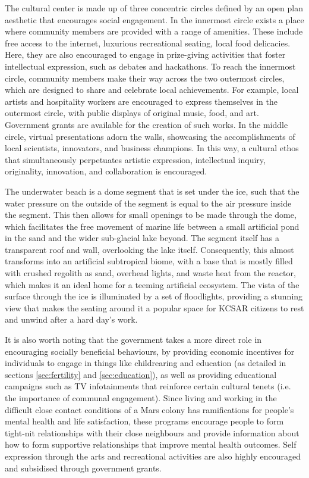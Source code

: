 \documentclass[fleqn,10pt]{Stylesheet} %
\begin{document}
The cultural center is made up of three concentric circles defined by an open plan aesthetic that encourages social engagement. In the innermost circle exists a place where community members are provided with a range of amenities. These include free access to the internet, luxurious recreational seating, local food delicacies. Here, they are also encouraged to engage in prize-giving activities that foster intellectual expression, such as debates and hackathons. To reach the innermost circle, community members make their way across the two outermost circles, which are designed to share and celebrate local achievements. For example, local artists and hospitality workers are encouraged to express themselves in the outermost circle, with public displays of original music, food, and art. Government grants are available for the creation of such works. In the middle circle, virtual presentations adorn the walls, showcasing the accomplishments of local scientists, innovators, and business champions. In this way, a cultural ethos that simultaneously perpetuates artistic expression, intellectual inquiry, originality, innovation, and collaboration is encouraged. 

The underwater beach is a dome segment that is set under the ice, such that the water pressure on the outside of the segment is equal to the air pressure inside the segment. This then allows for small openings to be made through the dome, which facilitates the free movement of marine life between a small artificial pond in the sand and the wider sub-glacial lake beyond. The segment itself has a transparent roof and wall, overlooking the lake itself. Consequently, this almost transforms into an artificial subtropical biome, with a base that is mostly filled with crushed regolith as sand, overhead lights, and waste heat from the reactor, which makes it an ideal home for a teeming artificial ecosystem. The vista of the surface through the ice is illuminated by a set of floodlights, providing a stunning view that makes the seating around it a popular space for KCSAR citizens to rest and unwind after a hard day's work.

It is also worth noting that the government takes a more direct role in encouraging socially beneficial behaviours, by providing economic incentives for individuals to engage in things like childrearing and education (as detailed in sections \ref{sec:fertility} and \ref{sec:education}), as well as providing educational campaigns such as TV infotainments that reinforce certain cultural tenets (i.e. the importance of communal engagement). Since living and working in the difficult close contact conditions of a Mars colony has ramifications for people's mental health and life satisfaction, these programs encourage people to form tight-nit relationships with their close neighbours and provide information about how to form supportive relationships that improve mental health outcomes. Self expression through the arts and recreational activities are also highly encouraged and subsidised through government grants.
\end{document}
